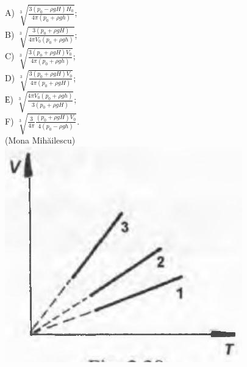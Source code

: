 \documentclass[10pt]{article}
\begin{document}
A) $\sqrt[3]{\frac{3\left(p_{0}-\rho g H\right) H_{0}}{4 \pi\left(p_{0}+\rho g h\right)}}$;\\
B) $\sqrt[3]{\frac{3\left(p_{0}+\rho g H\right)}{4 \pi V_{0}\left(p_{0}+\rho g h\right)}}$;\\
C) $\sqrt[3]{\frac{3\left(p_{0}+\rho g H\right) V_{0}}{4 \pi\left(p_{0}+\rho g h\right)}}$;\\
D) $\sqrt[3]{\frac{3\left(p_{0}+\rho g H\right) V_{0}}{4 \pi\left(p_{0}+\rho g H\right)}}$;\\
Е) $\sqrt[3]{\frac{4 \pi V_{0}\left(p_{0}+\rho g h\right)}{3\left(p_{0}+\rho g H\right)}}$;\\
F) $\sqrt[3]{\frac{3}{4 \pi} \frac{\left(p_{0}+\rho g H\right) V_{0}}{4\left(p_{0}-\rho g h\right)}}$.\\
(Mona Mihăilescu)\\
\includegraphics[max width=\textwidth, center]{2025_07_01_5b3ff9fa0d508c8e9f17g-130}
\end{document}
